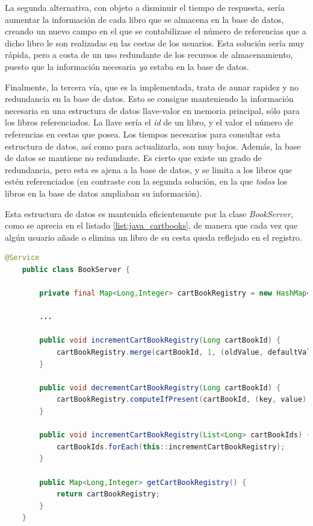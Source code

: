 \documentclass[a4paper,12pt,twoside,openright]{report}
\begin{document}
    La segunda alternativa, con objeto a disminuir el tiempo de respuesta, sería aumentar la información de cada libro que se almacena en la base de datos, creando un nuevo campo en el que se contabilizase el número de referencias que a dicho libro le son realizadas en las cestas de los usuarios. Esta solución sería muy rápida, pero a costa de un uso redundante de los recursos de almacenamiento, puesto que la información necesaria \emph{ya} estaba en la base de datos.
    
    Finalmente, la tercera vía, que es la implementada, trata de aunar rapidez y no redundancia en la base de datos. Esto se consigue manteniendo la información necesaria en una estructura de datos llave-valor en memoria principal, sólo para los libros referenciados. La llave sería el \emph{id} de un libro, y el valor el número de referencias en cestas que posea. Los tiempos necesarios para consultar esta estructura de datos, así como para actualizarla, son muy bajos. Además, la base de datos se mantiene no redundante. Es cierto que existe un grado de redundancia, pero esta es ajena a la base de datos, y se limita a los libros que estén referenciados (en contraste con la segunda solución, en la que \emph{todos} los libros en la base de datos ampliaban su información).
    
    Esta estructura de datos es mantenida eficientemente por la clase \emph{BookServer}, como se aprecia en el listado \ref{list:java_cartbooks}, de manera que cada vez que algún usuario añade o elimina un libro de su cesta queda reflejado en el registro.
    \\
    
    \begin{lstlisting}[language=Java,caption=Gestión del registro de libros referenciados en cestas,label=list:java_cartbooks]
    @Service
    public class BookServer {
    
    	private final Map<Long,Integer> cartBookRegistry = new HashMap<>();
    	
    	...
    	
	    public void incrementCartBookRegistry(Long cartBookId) {
		    cartBookRegistry.merge(cartBookId, 1, (oldValue, defaultValue) -> ++oldValue);
	    }
	    
	    public void decrementCartBookRegistry(Long cartBookId) {
		    cartBookRegistry.computeIfPresent(cartBookId, (key, value) -> (value > 1L) ? --value : null);
	    }
	    
	    public void incrementCartBookRegistry(List<Long> cartBookIds) {
	    	cartBookIds.forEach(this::incrementCartBookRegistry);
	    }
	    
	    public Map<Long,Integer> getCartBookRegistry() {
	    	return cartBookRegistry;
	    }
    }
    \end{lstlisting}
    
\end{document}
